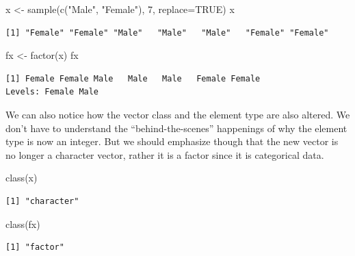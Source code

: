 \documentclass[
  letterpaper,
  DIV=11,
  numbers=noendperiod]{scrreprt}
\newenvironment{Shaded}{\begin{snugshade}}{\end{snugshade}}
\newcommand{\AttributeTok}[1]{\textcolor[rgb]{0.40,0.45,0.13}{#1}}
\newcommand{\ConstantTok}[1]{\textcolor[rgb]{0.56,0.35,0.01}{#1}}
\newcommand{\DecValTok}[1]{\textcolor[rgb]{0.68,0.00,0.00}{#1}}
\newcommand{\FunctionTok}[1]{\textcolor[rgb]{0.28,0.35,0.67}{#1}}
\newcommand{\NormalTok}[1]{\textcolor[rgb]{0.00,0.23,0.31}{#1}}
\newcommand{\OtherTok}[1]{\textcolor[rgb]{0.00,0.23,0.31}{#1}}
\newcommand{\StringTok}[1]{\textcolor[rgb]{0.13,0.47,0.30}{#1}}
\begin{document}
\begin{Shaded}
\begin{Highlighting}[]
\NormalTok{x }\OtherTok{\textless{}{-}} \FunctionTok{sample}\NormalTok{(}\FunctionTok{c}\NormalTok{(}\StringTok{"Male"}\NormalTok{, }\StringTok{"Female"}\NormalTok{), }\DecValTok{7}\NormalTok{, }\AttributeTok{replace=}\ConstantTok{TRUE}\NormalTok{)}
\NormalTok{x}
\end{Highlighting}
\end{Shaded}

\begin{verbatim}
[1] "Female" "Female" "Male"   "Male"   "Male"   "Female" "Female"
\end{verbatim}

\begin{Shaded}
\begin{Highlighting}[]
\NormalTok{fx }\OtherTok{\textless{}{-}} \FunctionTok{factor}\NormalTok{(x)}
\NormalTok{fx}
\end{Highlighting}
\end{Shaded}

\begin{verbatim}
[1] Female Female Male   Male   Male   Female Female
Levels: Female Male
\end{verbatim}

We can also notice how the vector class and the element type are also
altered. We don't have to understand the ``behind-the-scenes''
happenings of why the element type is now an integer. But we should
emphasize though that the new vector is no longer a character vector,
rather it is a factor since it is categorical data.

\begin{Shaded}
\begin{Highlighting}[]
\FunctionTok{class}\NormalTok{(x)}
\end{Highlighting}
\end{Shaded}

\begin{verbatim}
[1] "character"
\end{verbatim}

\begin{Shaded}
\begin{Highlighting}[]
\FunctionTok{class}\NormalTok{(fx)}
\end{Highlighting}
\end{Shaded}

\begin{verbatim}
[1] "factor"
\end{verbatim}
\end{document}
